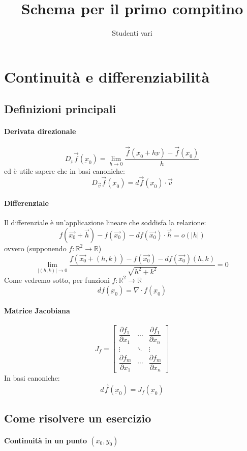 \documentclass[a4paper,12pt]{book}
\author{Studenti vari}
\title{Schema per il primo compitino}
\begin{document}

\section{Continuità e differenziabilità}
\subsection{Definizioni principali}
\paragraph{Derivata direzionale}
$$D_{\underbar{v}} \vec{f}(\underbar{x}_0) = \lim_{h \to 0}{\dfrac{\vec{f}(\underbar{x}_0+h\underbar{v})-\vec{f}(\underbar{x}_0)}{h}}$$
ed è utile sapere che in basi canoniche:
$$D_{\vec{v}} \vec{f}(\underbar{x}_0) = d\vec{f}(\underbar{x}_0)\cdot\vec{v}$$

\paragraph{Differenziale}
Il differenziale è un'applicazione lineare che soddisfa la relazione:
$$f(\vec{x_0}+\vec{h}) - f(\vec{x_0}) - df(\vec{x_0})\cdot\vec{h} = o(|h|)$$
ovvero (supponendo $f:\mathbb{R}^2\rightarrow\mathbb{R}$)
$$ \lim_{|(h, k)| \to 0} \dfrac{f(\vec{x_0}+(h, k)) - f(\vec{x_0}) - df(\vec{x_0})(h, k)}{\sqrt{h^2+k^2}} = 0 $$
Come vedremo sotto, per funzioni $f: \mathbb{R}^2 \rightarrow \mathbb{R}$
$$df(\underbar{x}_0) = \nabla \cdot f(\underbar{x}_0)$$
\paragraph{Matrice Jacobiana}
$$J_f = \begin{bmatrix} \dfrac{\partial f_1}{\partial x_1} & \cdots & \dfrac{\partial f_1}{\partial x_n} \\ \vdots & \ddots & \vdots \\ \dfrac{\partial f_m}{\partial x_1} & \cdots & \dfrac{\partial f_m}{\partial x_n}  \end{bmatrix}$$
In basi canoniche:
$$ d\vec{f}(\underbar{x}_0)= J_f(\underbar{x}_0) $$
\subsection{Come risolvere un esercizio}
\paragraph{Continuità in un punto $(x_0, y_0)$}
\end{document}
